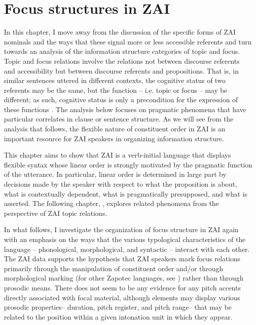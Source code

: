 

\chapter{Focus structures in ZAI}\label{focuschapter} 

In this chapter, I move away from the discussion of the specific forms of ZAI nominals and the ways that these signal more or less accessible referents and turn towards an analysis of the information structure categories of topic and focus. Topic and focus relations involve the relations not between discourse referents and accessibility but between discourse referents and propositions. That is, in similar sentences uttered in different contexts, the cognitive status of two referents may be the same, but the function -- i.e. topic or focus -- may be different; as such, cognitive status is only a precondition for the expression of these functions \citep{lambrecht1994}. The analysis below focuses on pragmatic phenomena that have particular correlates in clause or sentence structure. As we will see from the analysis that follows, the flexible nature of constituent order in ZAI is an important resource for ZAI speakers in organizing information structure.

This chapter aims to show that ZAI is a verb-initial language that displays flexible syntax whose linear order is strongly motivated by the pragmatic function of the utterance. In particular, linear order is determined in large part by decisions made by the speaker with respect to what the proposition is about, what is contextually dependent, what is pragmatically presupposed, and what is asserted. The following chapter, , explores related phenomena from the perspective of ZAI topic relations. 

In what follows, I investigate the organization of focus structure in ZAI again with an emphasis on the ways that the various typological characteristics of the language -- phonological, morphological, and syntactic -- interact with each other. The ZAI data supports the hypothesis that ZAI speakers mark focus relations primarily through the manipulation of constituent order and/or through morphological marking (for other Zapotec languages, see \citealt{broadwell1999b,lee2000}) rather than through prosodic means. There does not seem to be any evidence for any pitch accents directly associated with focal material, although elements may display various prosodic properties-- duration, pitch register, and pitch range-- that may be related to the position within a given intonation unit in which they appear.

